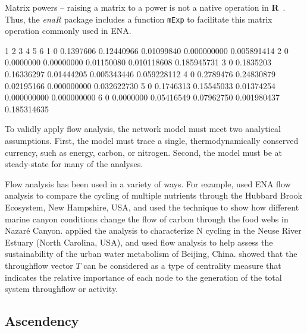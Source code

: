 \documentclass[article]{jss}
\newcommand{\R}{\textbf{R}}
\begin{document}
Matrix powers -- raising a matrix to a power is not a native operation
in \R\ .  Thus, the \textit{enaR} package includes a function
\texttt{mExp} to facilitate this matrix operation commonly used in ENA.

\begin{Schunk}
\begin{Soutput}
  1         2          3          4           5           6
1 0 0.1397606 0.12440966 0.01099840 0.000000000 0.005891414
2 0 0.0000000 0.00000000 0.01150080 0.010118608 0.185945731
3 0 0.1835203 0.16336297 0.01444205 0.005343446 0.059228112
4 0 0.2789476 0.24830879 0.02195166 0.000000000 0.032622730
5 0 0.1746313 0.15545033 0.01374254 0.000000000 0.000000000
6 0 0.0000000 0.05416549 0.07962750 0.001980437 0.185314635
\end{Soutput}
\end{Schunk}

To validly apply flow analysis, the network model must meet two
analytical assumptions.  First, the model must trace a single,
thermodynamically conserved currency, such as energy, carbon, or
nitrogen.  Second, the model must be at steady-state for many of the
analyses.

Flow analysis has been used in a variety of ways.  For example,
\citet{finn80} used ENA flow analysis to compare the cycling of
multiple nutrients through the Hubbard Brook Ecosystem, New Hampshire,
USA, and \citet{vanoevelen2009cold} used the technique to show how different
marine canyon conditions change the flow of carbon through the food
webs in Nazar\'{e} Canyon.  \cite{gattie06} applied the analysis to
characterize N cycling in the Neuse River Estuary (North Carolina,
USA), and \cite{zhang10} used flow analysis to help assess the
sustainability of the urban water metabolism of Beijing, China.
\citet{borrett13} showed that the throughflow vector $T$ can be
considered as a type of centrality measure that indicates the relative
importance of each node to the generation of the total system
throughflow or activity.


\subsection{Ascendency}
\end{document}
